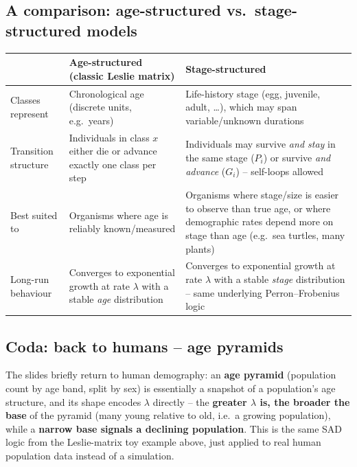 \documentclass[11pt,a4paper]{article}
\begin{document}
\subsection{A comparison: age-structured vs.\ stage-structured models}
\begin{center}
\begin{tabularx}{\textwidth}{@{}l X X@{}}
\toprule
& \textbf{Age-structured (classic Leslie matrix)} & \textbf{Stage-structured} \\
\midrule
Classes represent & Chronological age (discrete units, e.g.\ years) & Life-history stage (egg, juvenile, adult, \ldots), which may span variable/unknown durations \\
Transition structure & Individuals in class $x$ either die or advance exactly one class per step & Individuals may survive \emph{and stay} in the same stage ($P_i$) or survive \emph{and advance} ($G_i$) -- self-loops allowed \\
Best suited to & Organisms where age is reliably known/measured & Organisms where stage/size is easier to observe than true age, or where demographic rates depend more on stage than age (e.g.\ sea turtles, many plants) \\
Long-run behaviour & Converges to exponential growth at rate $\lambda$ with a stable \emph{age} distribution & Converges to exponential growth at rate $\lambda$ with a stable \emph{stage} distribution -- same underlying Perron--Frobenius logic \\
\bottomrule
\end{tabularx}
\end{center}

\subsection{Coda: back to humans -- age pyramids}
The slides briefly return to human demography: an \textbf{age pyramid} (population count by age band, split by sex) is essentially a snapshot of a population's age structure, and its shape encodes $\lambda$ directly -- the \textbf{greater $\lambda$ is, the broader the base} of the pyramid (many young relative to old, i.e.\ a growing population), while a \textbf{narrow base signals a declining population}. This is the same SAD logic from the Leslie-matrix toy example above, just applied to real human population data instead of a simulation.
\end{document}
